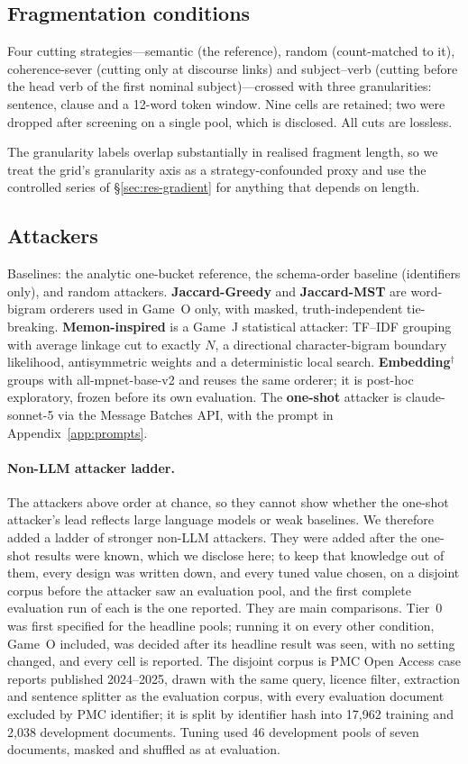 \documentclass[sigconf,review]{acmart}
\newcommand{\posthoc}{\ensuremath{^{\dagger}}}
\newcommand{\sonnet}{\textsf{claude-sonnet-5}}
\begin{document}
\subsection{Fragmentation conditions}
\label{sec:conditions}
Four cutting strategies---semantic (the reference), random (count-matched to
it), coherence-sever (cutting only at discourse links) and subject--verb
(cutting before the head verb of the first nominal subject)---crossed with
three granularities: sentence, clause and a 12-word token window. Nine cells
are retained; two were dropped after screening on a single pool, which is
disclosed. All cuts are lossless.

The granularity labels overlap substantially in realised fragment length, so
we treat the grid's granularity axis as a strategy-confounded proxy and use the
controlled series of \S\ref{sec:res-gradient} for anything that depends on
length.

\subsection{Attackers}
\label{sec:attackers}
Baselines: the analytic one-bucket reference, the schema-order baseline
(identifiers only), and random attackers. \textbf{Jaccard-Greedy} and
\textbf{Jaccard-MST} are word-bigram orderers used in Game~O only, with masked,
truth-independent tie-breaking. \textbf{Memon-inspired} is a Game~J statistical
attacker: TF--IDF grouping with average linkage cut to exactly $N$, a
directional character-bigram boundary likelihood, antisymmetric weights and a
deterministic local search. \textbf{Embedding}\posthoc{} groups with
\textsf{all-mpnet-base-v2} and reuses the same orderer; it is post-hoc
exploratory, frozen before its own evaluation. The \textbf{one-shot} attacker is
\sonnet{} via the Message Batches API, with the prompt in
Appendix~\ref{app:prompts}.

\paragraph{Non-LLM attacker ladder.} The attackers above order at chance, so
they cannot show whether the one-shot attacker's lead reflects large language
models or weak baselines. We therefore added a ladder of stronger non-LLM
attackers. They were added after the one-shot results were known, which we
disclose here; to keep that knowledge out of them, every design was written
down, and every tuned value chosen, on a disjoint corpus before the attacker
saw an evaluation pool, and the first complete evaluation run of each is the
one reported. They are main comparisons. Tier~0 was first specified for the
headline pools; running it on every other condition, Game~O included, was
decided after its headline result was seen, with no setting changed, and every
cell is reported. The disjoint corpus is PMC Open Access
case reports published 2024--2025, drawn with the same query, licence filter,
extraction and sentence splitter as the evaluation corpus, with every
evaluation document excluded by PMC identifier; it is split by identifier hash
into 17{,}962 training and 2{,}038 development documents. Tuning used
46 development pools of seven documents, masked and shuffled as at evaluation.
\end{document}
